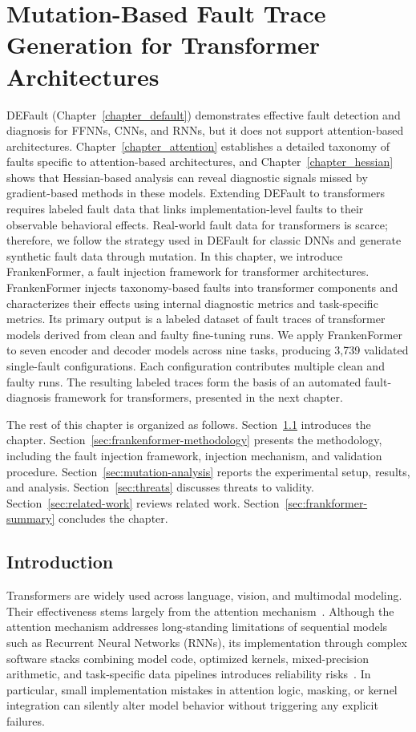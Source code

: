 \chapter{Mutation-Based Fault Trace Generation for Transformer Architectures}
\label{chapter_frankenformer}

DEFault (Chapter~\ref{chapter_default}) demonstrates effective fault detection and diagnosis for FFNNs, CNNs, and RNNs, but it does not support attention-based architectures.
Chapter~\ref{chapter_attention} establishes a detailed taxonomy of faults specific to attention-based architectures, and Chapter~\ref{chapter_hessian} shows that Hessian-based analysis can reveal diagnostic signals missed by gradient-based methods in these models. Extending DEFault to transformers requires labeled fault data that links implementation-level faults to their observable behavioral effects.
Real-world fault data for transformers is scarce; therefore, we follow the strategy used in DEFault for classic DNNs and generate synthetic fault data through mutation. In this chapter, we introduce FrankenFormer, a fault injection framework for transformer architectures. FrankenFormer injects taxonomy-based faults into transformer components and characterizes their effects using internal diagnostic metrics and task-specific metrics.
Its primary output is a labeled dataset of fault traces of transformer models derived from clean and faulty fine-tuning runs.
We apply FrankenFormer to seven encoder and decoder models across nine tasks, producing 3{,}739 validated single-fault configurations. Each configuration contributes multiple clean and faulty runs.
The resulting labeled traces form the basis of an automated fault-diagnosis framework for transformers, presented in the next chapter.

The rest of this chapter is organized as follows.
Section~\ref{sec:frankenformer-introduction} introduces the chapter.
Section~\ref{sec:frankenformer-methodology} presents the methodology, including the fault injection framework, injection mechanism, and validation procedure.
Section~\ref{sec:mutation-analysis} reports the experimental setup, results, and analysis.
Section~\ref{sec:threats} discusses threats to validity.
Section~\ref{sec:related-work} reviews related work.
Section~\ref{sec:frankformer-summary} concludes the chapter.

\section{Introduction}
\label{sec:frankenformer-introduction}
Transformers are widely used across language, vision, and multimodal modeling.
Their effectiveness stems largely from the attention mechanism~\citep{vaswani2017attention}.
Although the attention mechanism addresses long-standing limitations of sequential models such as Recurrent Neural Networks (RNNs), its implementation through complex software stacks combining model code, optimized kernels, mixed-precision arithmetic, and task-specific data pipelines introduces reliability risks~\citep{zhang2020machine,ABNN_sigma,attentiondetails}. In particular, small implementation mistakes in attention logic, masking, or kernel integration can silently alter model behavior without triggering any explicit failures.

